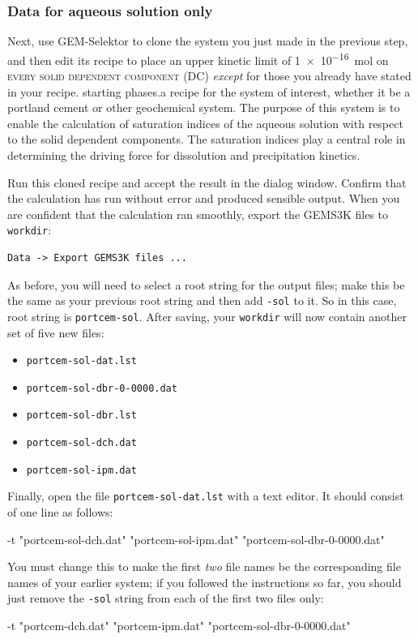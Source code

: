 \documentclass{article}
\begin{document}
\subsubsection{Data for aqueous solution only}
Next, use GEM-Selektor to clone the system you just made in the previous step, and then
edit its recipe to place an upper kinetic limit of \SI{1e-16}{\mole} on \textsc{every
solid dependent component} (DC) \textit{except} for those  you already have stated in your
recipe.  starting phases.a recipe for the system of interest, whether it be a portland
cement or other geochemical system.  The purpose of this system is to enable the calculation
of saturation indices of the aqueous solution with respect to the solid dependent components.
The saturation indices play a central role in determining the driving force for dissolution
and precipitation kinetics.

Run this cloned recipe and accept the result in the dialog window.  Confirm
that the calculation has run without error and produced sensible output.  When you are
confident that the calculation ran smoothly, export the GEMS3K files to \verb!workdir!:
\begin{verbatim}
Data -> Export GEMS3K files ...
\end{verbatim}
As before, you will need to select a root string for the output files; make this be the
same as your previous root string and then add \verb!-sol! to it.  So in this case,
root string is \verb!portcem-sol!.  After saving, your \verb!workdir! will now contain another
set of five new files:
\begin{itemize}
    \item \verb!portcem-sol-dat.lst!
    \item \verb!portcem-sol-dbr-0-0000.dat!
    \item \verb!portcem-sol-dbr.lst!
    \item \verb!portcem-sol-dch.dat!
    \item \verb!portcem-sol-ipm.dat!
\end{itemize}

Finally, open the file \verb!portcem-sol-dat.lst! with a text editor. It should consist
of one line as follows:
\small{
\begin{verbatim*}
-t "portcem-sol-dch.dat" "portcem-sol-ipm.dat" "portcem-sol-dbr-0-0000.dat"
\end{verbatim*}
}

\normalsize{ }
You must change this to make the first \textit{two} file names be the corresponding file names
of your earlier system; if you followed the instructions so far, you should just remove
the \verb!-sol! string from each of the first two files only:
\small{
\begin{verbatim*}
-t "portcem-dch.dat" "portcem-ipm.dat" "portcem-sol-dbr-0-0000.dat"
\end{verbatim*}
}
\end{document}
